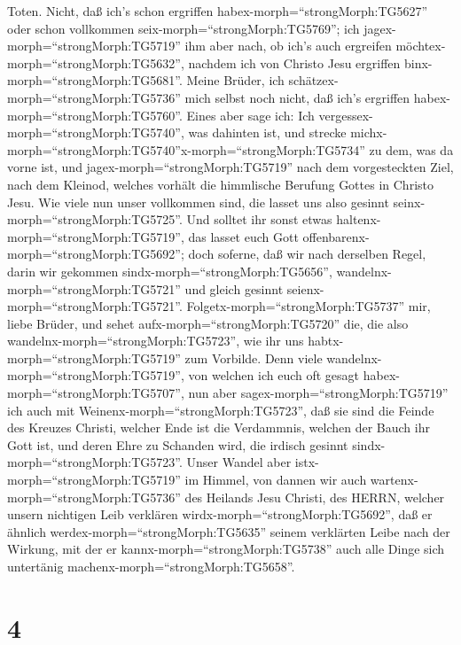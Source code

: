 Toten.  Nicht, daß ich's schon ergriffen
habex-morph=``strongMorph:TG5627'' oder schon vollkommen
seix-morph=``strongMorph:TG5769''; ich
jagex-morph=``strongMorph:TG5719'' ihm aber nach, ob ich's auch
ergreifen möchtex-morph=``strongMorph:TG5632'', nachdem ich von Christo
Jesu ergriffen binx-morph=``strongMorph:TG5681''.  Meine
Brüder, ich schätzex-morph=``strongMorph:TG5736'' mich selbst noch
nicht, daß ich's ergriffen habex-morph=``strongMorph:TG5760''. Eines
aber sage ich: Ich vergessex-morph=``strongMorph:TG5740'', was dahinten
ist, und strecke
michx-morph=``strongMorph:TG5740''\textbar x-morph=``strongMorph:TG5734''
zu dem, was da vorne ist,  und
jagex-morph=``strongMorph:TG5719'' nach dem vorgesteckten Ziel, nach dem
Kleinod, welches vorhält die himmlische Berufung Gottes in Christo Jesu.
 Wie viele nun unser vollkommen sind, die lasset uns also
gesinnt seinx-morph=``strongMorph:TG5725''. Und solltet ihr sonst etwas
haltenx-morph=``strongMorph:TG5719'', das lasset euch Gott
offenbarenx-morph=``strongMorph:TG5692'';  doch soferne,
daß wir nach derselben Regel, darin wir gekommen
sindx-morph=``strongMorph:TG5656'',
wandelnx-morph=``strongMorph:TG5721'' und gleich gesinnt
seienx-morph=``strongMorph:TG5721''. 
Folgetx-morph=``strongMorph:TG5737'' mir, liebe Brüder, und sehet
aufx-morph=``strongMorph:TG5720'' die, die also
wandelnx-morph=``strongMorph:TG5723'', wie ihr uns
habtx-morph=``strongMorph:TG5719'' zum Vorbilde.  Denn
viele wandelnx-morph=``strongMorph:TG5719'', von welchen ich euch oft
gesagt habex-morph=``strongMorph:TG5707'', nun aber
sagex-morph=``strongMorph:TG5719'' ich auch mit
Weinenx-morph=``strongMorph:TG5723'', daß sie sind die Feinde des
Kreuzes Christi,  welcher Ende ist die Verdammnis, welchen
der Bauch ihr Gott ist, und deren Ehre zu Schanden wird, die irdisch
gesinnt sindx-morph=``strongMorph:TG5723''.  Unser Wandel
aber istx-morph=``strongMorph:TG5719'' im Himmel, von dannen wir auch
wartenx-morph=``strongMorph:TG5736'' des Heilands Jesu Christi, des
HERRN,  welcher unsern nichtigen Leib verklären
wirdx-morph=``strongMorph:TG5692'', daß er ähnlich
werdex-morph=``strongMorph:TG5635'' seinem verklärten Leibe nach der
Wirkung, mit der er kannx-morph=``strongMorph:TG5738'' auch alle Dinge
sich untertänig machenx-morph=``strongMorph:TG5658''.

\hypertarget{section-3}{%
\section{4}\label{section-3}}

